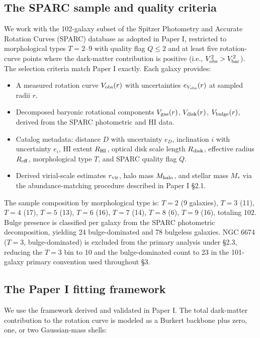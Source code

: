 \documentclass[linenumbers,trackchanges]{aastex701}
\begin{document}
\subsection{The SPARC sample and quality criteria}

We work with the 102-galaxy subset of the Spitzer Photometry and Accurate Rotation Curves (SPARC) database \citet{Lelli2016} as adopted in Paper I, restricted to morphological types $T = 2$--9 with quality flag $Q \le 2$ and at least five rotation-curve points where the dark-matter contribution is positive (i.e., $V_{\rm obs}^2 > V_{\rm bar}^2$). The selection criteria match Paper I exactly. Each galaxy provides:

\begin{itemize}
  \item A measured rotation curve $V_{\rm obs}(r)$ with uncertainties $e_{V_{\rm obs}}(r)$ at sampled radii $r$.
  \item Decomposed baryonic rotational components $V_{\rm gas}(r)$, $V_{\rm disk}(r)$, $V_{\rm bulge}(r)$, derived from the SPARC photometric and HI data.
  \item Catalog metadata: distance $D$ with uncertainty $e_D$, inclination $i$ with uncertainty $e_i$, HI extent $R_{\rm HI}$, optical disk scale length $R_{\rm disk}$, effective radius $R_{\rm eff}$, morphological type $T$, and SPARC quality flag $Q$.
  \item Derived virial-scale estimates $r_{\rm vir}$, halo mass $M_{\rm halo}$, and stellar mass $M_*$ via the abundance-matching procedure described in Paper I \S2.1.
\end{itemize}

The sample composition by morphological type is: $T = 2$ (9 galaxies), $T = 3$ (11), $T = 4$ (17), $T = 5$ (13), $T = 6$ (16), $T = 7$ (14), $T = 8$ (6), $T = 9$ (16), totaling 102. Bulge presence is classified per galaxy from the SPARC photometric decomposition, yielding 24 bulge-dominated and 78 bulgeless galaxies. NGC 6674 ($T = 3$, bulge-dominated) is excluded from the primary analysis under \S2.3, reducing the $T = 3$ bin to 10 and the bulge-dominated count to 23 in the 101-galaxy primary convention used throughout \S3.

\subsection{The Paper I fitting framework}

We use the framework derived and validated in Paper I. The total dark-matter contribution to the rotation curve is modeled as a Burkert backbone plus zero, one, or two Gaussian-mass shells:
\end{document}
